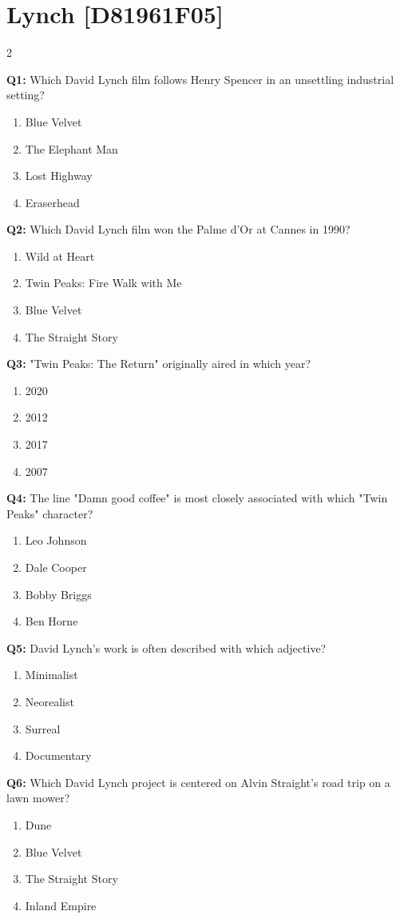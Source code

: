 \documentclass[10pt]{article}
\begin{document}
\section*{Lynch \footnotesize [D81961F05]}
\begin{multicols}{2}

\textbf{Q1:} Which David Lynch film follows Henry Spencer in an unsettling industrial setting?

\begin{enumerate}[label=\arabic*.]
\item Blue Velvet
\item The Elephant Man
\item Lost Highway
\item Eraserhead
\end{enumerate}
\textbf{Q2:} Which David Lynch film won the Palme d'Or at Cannes in 1990?

\begin{enumerate}[label=\arabic*.]
\item Wild at Heart
\item Twin Peaks: Fire Walk with Me
\item Blue Velvet
\item The Straight Story
\end{enumerate}
\textbf{Q3:} "Twin Peaks: The Return" originally aired in which year?

\begin{enumerate}[label=\arabic*.]
\item 2020
\item 2012
\item 2017
\item 2007
\end{enumerate}
\textbf{Q4:} The line "Damn good coffee" is most closely associated with which "Twin Peaks" character?

\begin{enumerate}[label=\arabic*.]
\item Leo Johnson
\item Dale Cooper
\item Bobby Briggs
\item Ben Horne
\end{enumerate}
\textbf{Q5:} David Lynch's work is often described with which adjective?

\begin{enumerate}[label=\arabic*.]
\item Minimalist
\item Neorealist
\item Surreal
\item Documentary
\end{enumerate}
\textbf{Q6:} Which David Lynch project is centered on Alvin Straight's road trip on a lawn mower?

\begin{enumerate}[label=\arabic*.]
\item Dune
\item Blue Velvet
\item The Straight Story
\item Inland Empire
\end{enumerate}
\end{multicols}
\end{document}

